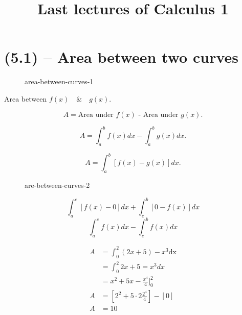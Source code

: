 \documentclass{book}
\title{Last lectures of Calculus 1}
\author{}
\date{}
\begin{document}
\tableofcontents


\chapter{(5.1) -- Area between two curves}


\begin{figure}[ht]
    \centering
    \caption{area-between-curves-1}
    \label{fig:area-between-curves-1}
\end{figure}

Area between $f(x)\quad \& \quad g(x)$.

\[ A= \text{Area under $f(x)$ - Area under $g(x)$} .\] 

\[ A= \int^b_a f(x) dx - \int^b_a g(x) dx .\] 

\[
    A=\int^b_a \left[f(x)-g(x)\right] dx
.\] 



\begin{figure}[htbp]
    \centering
    \caption{are-between-curves-2}
    \label{fig:are-between-curves-2}
\end{figure}

\[ \int_{a}^{c} \left[ f(x)-0 \right] dx + \int_{c}^{b}  \left[ 0-f(x) \right] dx \] 
\[ \int_{a}^{c}  f(x) dx - \int_{c}^{b} f(x) dx \] 




\begin{align*}
A &=\int_{0}^{2}  (2x+5) - x^3 \text{dx}\\
&= \int_{0}^{2}2x+5=x^3 dx   \\
&= x^2+5x - \frac{x^4}{4}]^2_0  \\
A &= \left[ 2^2+5\cdot 2 \frac{2^4}{4} \right] - \left[ 0 \right]   \\
A&= 10 \\
\end{align*}
\end{document}
